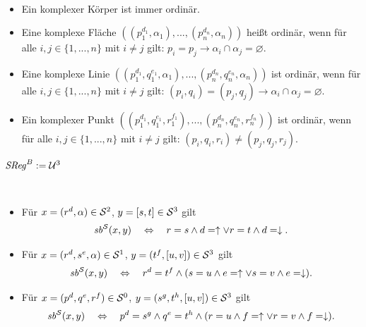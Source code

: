 \begin{dfn}[Ordinärität]\ 
    \begin{itemize}
        \item Ein komplexer Körper ist immer ordinär.
        \item Eine komplexe Fläche $((p_1^{d_1}, \alpha_1), ..., (p_n^{d_n}, \alpha_n))$ heißt ordinär, wenn für alle $i,j \in \{1, ..., n\}$ mit $i \neq j$ gilt: $p_i = p_j \to \alpha_i \cap \alpha_j = \varnothing$.
        \item Eine komplexe Linie $((p_1^{d_1}, q_1^{e_1}, \alpha_1), ... , (p_n^{d_n}, q_n^{e_n}, \alpha_n))$ ist ordinär, wenn für alle $i,j \in \{1, ..., n\}$ mit $i \neq j$ gilt: $(p_i,q_i) = (p_j,q_j) \to \alpha_i \cap \alpha_j = \varnothing$.
        \item Ein komplexer Punkt $((p_1^{d_1}, q_1^{e_1}, r_1^{f_1}), ... , (p_n^{d_n}, q_n^{e_n}, r_n^{f_n}))$ ist ordinär, wenn für alle $i,j \in \{1, ..., n\}$ mit $i \neq j$ gilt: $(p_i, q_i,r_i) \neq (p_j,q_j,r_j)$.
    \end{itemize}
\end{dfn}



\begin{dfn}[$\GSReg$]
    $\mathit{S\hspace*{-0.25ex}Reg}^B := \mathcal{U}^3$
\end{dfn}


\begin{dfn}[$\Gsb^\einf$]\ 
    \begin{itemize}
        \item Für $x = (r^d,\alpha) \in \mathcal{S}^2$, $y = [s,t] \in \mathcal{S}^3$ gilt
            \begin{align*}
                \mathit{sb}^{\mathcal{S}}(x,y) 
                \quad \Leftrightarrow \quad 
                r=s \land d=\uparrow \lor r=t \land d=\downarrow.
            \end{align*}
        \item Für $x = (r^d,s^e,\alpha) \in \mathcal{S}^1$, $y = (t^f, [u,v]) \in \mathcal{S}^3$ gilt
            \begin{align*}
                \mathit{sb}^{\mathcal{S}}(x,y) 
                \quad \Leftrightarrow \quad 
                r^d = t^f \land ( s=u \land e=\uparrow \lor s=v \land e=\downarrow ).
            \end{align*}
        \item Für $x = (p^d,q^e,r^f) \in \mathcal{S}^0$, $y = (s^g, t^h, [u,v]) \in \mathcal{S}^3$ gilt
            \begin{align*}
                \mathit{sb}^{\mathcal{S}}(x,y) 
                \quad \Leftrightarrow \quad 
                p^d = s^g \land q^e = t^h \land ( r=u \land f=\uparrow \lor r=v \land f=\downarrow ).
            \end{align*}
    \end{itemize}
\end{dfn}


